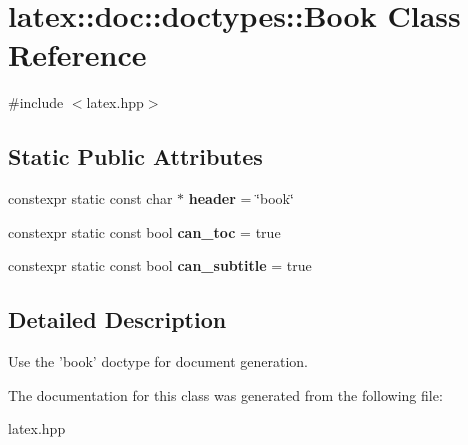 \hypertarget{classlatex_1_1doc_1_1doctypes_1_1Book}{\section{latex\-:\-:doc\-:\-:doctypes\-:\-:Book Class Reference}
\label{classlatex_1_1doc_1_1doctypes_1_1Book}
}


{\ttfamily \#include $<$latex.\-hpp$>$}

\subsection*{Static Public Attributes}
\begin{DoxyCompactItemize}
\item 
\hypertarget{classlatex_1_1doc_1_1doctypes_1_1Book_a36a8b56c9502dab4a4301b1153851540}{constexpr static const char $\ast$ {\bfseries header} = \char`\"{}book\char`\"{}}\label{classlatex_1_1doc_1_1doctypes_1_1Book_a36a8b56c9502dab4a4301b1153851540}

\item 
\hypertarget{classlatex_1_1doc_1_1doctypes_1_1Book_ac71f7b7b881db6ae5b9fa295b02b30f0}{constexpr static const bool {\bfseries can\-\_\-toc} = true}\label{classlatex_1_1doc_1_1doctypes_1_1Book_ac71f7b7b881db6ae5b9fa295b02b30f0}

\item 
\hypertarget{classlatex_1_1doc_1_1doctypes_1_1Book_a07a5af234d52ca56082d3a7d58af5615}{constexpr static const bool {\bfseries can\-\_\-subtitle} = true}\label{classlatex_1_1doc_1_1doctypes_1_1Book_a07a5af234d52ca56082d3a7d58af5615}

\end{DoxyCompactItemize}


\subsection{Detailed Description}
Use the 'book' doctype for document generation. 

The documentation for this class was generated from the following file\-:\begin{DoxyCompactItemize}
\item 
latex.\-hpp\end{DoxyCompactItemize}
